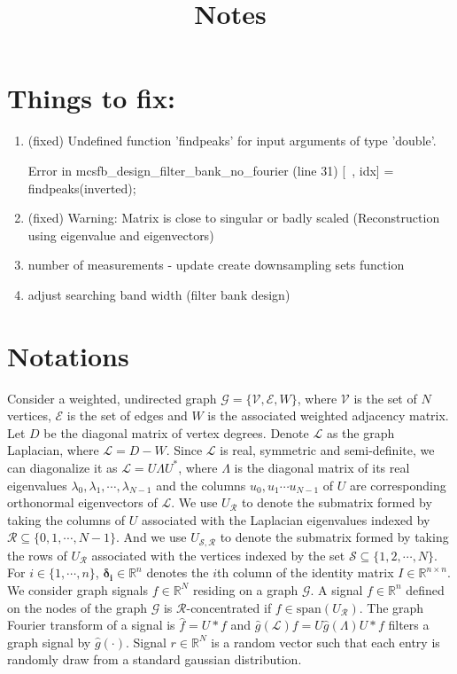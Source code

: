 \documentclass[a4paper]{article}
\title{Notes}
\newcommand{\R}{\mathcal{R}}
\newcommand{\RR}{\mathbb{R}}
\newcommand{\G}{\mathcal{G}}
\newcommand{\V}{\mathcal{V}}
\newcommand{\E}{\mathcal{E}}
\newcommand{\La}{\mathcal{L}}
\newcommand{\UR}{U_{\mathcal{R}}}
\theoremstyle{definition}
\begin{document}
\maketitle

\newpage


\section{Things to fix:}
\begin{enumerate}
\item (fixed) Undefined function 'findpeaks' for input
arguments of type 'double'.

Error in mcsfb\_design\_filter\_bank\_no\_fourier
(line 31)
    [~, idx] = findpeaks(inverted); 
    
\item (fixed) Warning: Matrix is close to singular or badly scaled (Reconstruction using eigenvalue and eigenvectors)


\item number of measurements - update create downsampling sets function

\item adjust searching band width (filter bank design)

\end{enumerate}

\section{Notations}
Consider a weighted, undirected graph $\G = \{ \V, \E, W\}$, where $\V$ is the set of $N$ vertices, $\E$ is the set of edges and $W$ is the associated weighted adjacency matrix. Let $D$ be the diagonal matrix of vertex degrees. Denote $\La$ as the graph Laplacian, where $\La = D-W$. Since $\La$ is real, symmetric and semi-definite, we can diagonalize it as $\La =U\Lambda U^*$, where $\Lambda$ is the diagonal matrix of its real eigenvalues $\lambda_0, \lambda_1,\cdots, \lambda_{N-1}$ and the columns $u_0, u_1 \cdots u_{N-1}$ of $U$ are corresponding orthonormal eigenvectors of $\La$. We use $\UR$ to denote the submatrix formed by taking the columns of $U$ associated with the Laplacian eigenvalues indexed by $\mathcal{R} \subseteq \{0,1,\cdots,N-1\}$. And we use $U_{\mathcal{S},\mathcal{R}}$ to denote the submatrix formed by taking the rows of $U_{\mathcal{R}}$ associated with the vertices indexed by the set $\mathcal{S} \subseteq \{1,2,\cdots, N\}$. For $i \in \{1,\cdots,n\}$, $\bm{\delta_i} \in \RR^n$ denotes the $i$th column of the identity matrix $I \in \RR^{n\times n}.$
We consider graph signals $f \in \RR^N$ residing on a graph $\G$. A signal $f \in \RR^n$ defined on the nodes of the graph $\G$ is $\R$-concentrated if $f \in \text{span}(U_{\R})$. The graph Fourier transform of a signal is $\hat{f} = U*f$ and $\hat{g}(\La) f = U\hat{g}(\Lambda)U*f$ filters a graph signal by $\hat{g}(\cdot)$. Signal $r\in \RR^N$ is a random vector such that each entry is randomly draw from a standard gaussian distribution.
\end{document}
